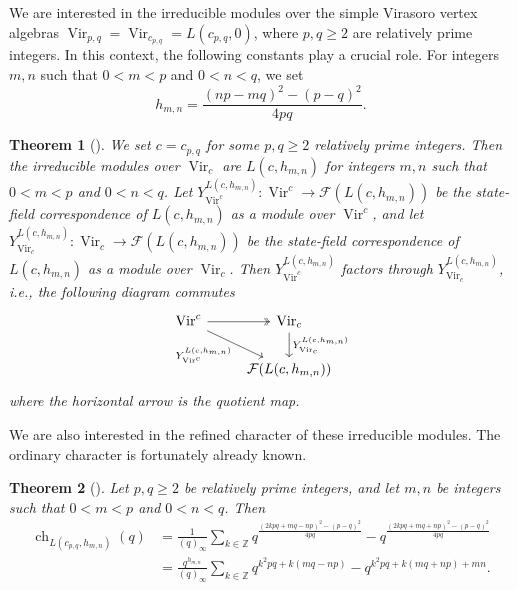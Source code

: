 \documentclass[a4paper, 12pt, reqno]{amsart}
\newtheorem{theorem}{Theorem}[section]
\theoremstyle{remark}
\DeclareMathOperator{\Vir}{Vir}
\DeclareMathOperator{\ch}{ch}
\begin{document}
We are interested in the irreducible modules over the simple Virasoro vertex algebras $\Vir_{p, q} = \Vir_{c_{p, q}} = L(c_{p, q}, 0)$, where $p, q \ge 2$ are relatively prime integers.
In this context, the following constants play a crucial role.
For integers $m, n$ such that $0 < m < p$ and $0 < n < q$, we set
\begin{equation*}
  h_{m, n} = \frac{(np - mq)^2 - (p - q)^2}{4pq}.
\end{equation*}

\begin{theorem}[{\cite{wang_rationality_1993}}]
  \label{thr:5}
  We set $c = c_{p, q}$ for some $p, q \ge 2$ relatively prime integers.
  Then the irreducible modules over $\Vir_c$ are $L(c, h_{m, n})$ for integers $m, n$ such that $0 < m < p$ and $0 < n < q$.
  Let $Y^{L(c, h_{m, n})}_{\Vir^c}: \Vir^c \to \mathcal{F}(L(c, h_{m, n}))$ be the state-field correspondence of $L(c, h_{m, n})$ as a module over $\Vir^c$, and let $Y^{L(c, h_{m, n})}_{\Vir_c}: \Vir_c \to \mathcal{F}(L(c, h_{m, n}))$ be the state-field correspondence of $L(c, h_{m, n})$ as a module over $\Vir_c$.
  Then $Y^{L(c, h_{m, n})}_{\Vir^c}$ factors through $Y^{L(c, h_{m, n})}_{\Vir_c}$, i.e., the following diagram commutes
  \begin{equation*}
    \begin{tikzcd}
      \Vir^c \arrow[r, two heads] \arrow[rd, "{Y^{L(c, h_{m, n})}_{\Vir^c}}"'] & {\Vir_c} \arrow[d, "{Y^{L(c, h_{m, n})}_{\Vir_c}}"] \\
      & {\mathcal{F}(L(c, h_{m, n}))}
    \end{tikzcd}
  \end{equation*}
  where the horizontal arrow is the quotient map.
\end{theorem}

We are also interested in the refined character of these irreducible modules.
The ordinary character is fortunately already known.

\begin{theorem}[{\cite{feigin_verma_1984}}]
  \label{thr:6}
  Let $p, q \ge 2$ be relatively prime integers, and let $m, n$ be integers such that $0 < m < p$ and $0 < n < q$.
  Then
  \begin{align*}
    \ch_{L(c_{p, q}, h_{m, n})}(q) &= \frac{1}{(q)_{\infty}}\sum_{k \in \mathbb{Z}}q^{\frac{(2kpq + mq - np)^2 - (p - q)^2}{4pq}} - q^{\frac{(2kpq + mq + np)^2 - (p - q)^2}{4pq}} \\
                                   &= \frac{q^{h_{m, n}}}{(q)_{\infty}}\sum_{k \in \mathbb{Z}}q^{k^2pq + k(mq - np)} - q^{k^2pq + k(mq + np) + mn}.
  \end{align*}
\end{theorem}
\end{document}
